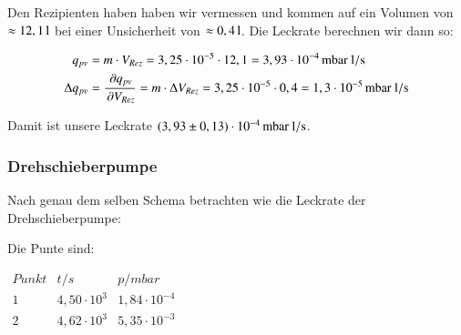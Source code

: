 Den Rezipienten haben haben wir vermessen und kommen auf ein Volumen von $\approx \unit[12,1]{l}$ bei einer Unsicherheit von $\approx \unit[0,4]{l}$. Die Leckrate berechnen wir dann so:

\begin{align*}
q_{pv} &= m \cdot V_{Rez} = 3,25 \cdot 10^{-5} \cdot 12,1 = \unit[3,93 \cdot 10^{-4}]{mbar \ l/s} \\
\Delta q_{pv} &= \frac{\p q_{pv}}{\p V_{Rez}} = m \cdot \Delta V_{Rez} = 3,25 \cdot 10^{-5} \cdot 0,4 = \unit[1,3 \cdot 10^{-5}]{mbar \ l/s}
\end{align*}

Damit ist unsere Leckrate $\unit[(3,93 \pm 0,13) \cdot 10^{-4}]{mbar \ l/s}$.



\subsubsection*{Drehschieberpumpe}

Nach genau dem selben Schema betrachten wie die Leckrate der Drehschieberpumpe:

\begin{figure}[h]
\end{figure}

Die Punte sind:

\begin{center}
	$
	\begin{matrix}
	Punkt	& t/s & p/mbar \\ 
	1	& 4,50 \cdot 10^{3} & 1,84 \cdot 10^{-4} \\ 
	2	& 4,62 \cdot 10^{3} & 5,35 \cdot 10^{-3} \\ 
	\end{matrix} 
	$	
\end{center}

